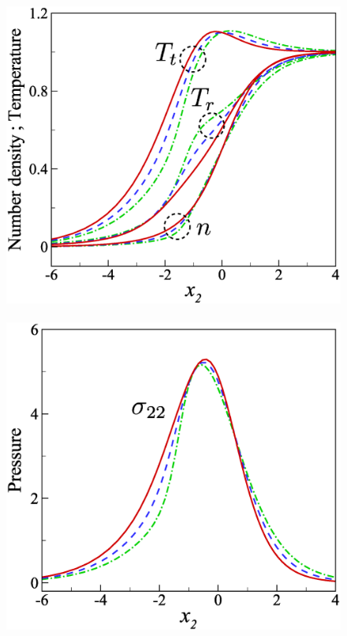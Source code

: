 \begin{figure}[!t]
	\centering
	\includegraphics[scale=0.26,clip=true]{Fig/ShockWave_T_vf}\
	\includegraphics[scale=0.26,clip=true]{Fig/ShockWave_P_vf}\

\end{figure}
